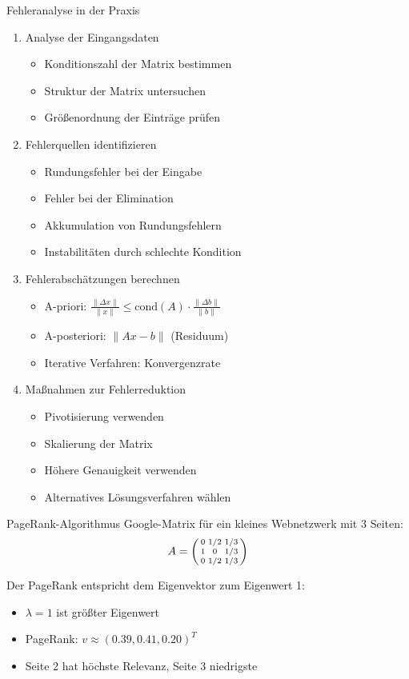 \begin{KR}{Fehleranalyse in der Praxis}
\begin{enumerate}
    \item Analyse der Eingangsdaten
    \begin{itemize}
        \item Konditionszahl der Matrix bestimmen
        \item Struktur der Matrix untersuchen
        \item Größenordnung der Einträge prüfen
    \end{itemize}
    
    \item Fehlerquellen identifizieren
    \begin{itemize}
        \item Rundungsfehler bei der Eingabe
        \item Fehler bei der Elimination
        \item Akkumulation von Rundungsfehlern
        \item Instabilitäten durch schlechte Kondition
    \end{itemize}
    
    \item Fehlerabschätzungen berechnen
    \begin{itemize}
        \item A-priori: $\frac{\|\Delta x\|}{\|x\|} \leq \text{cond}(A) \cdot \frac{\|\Delta b\|}{\|b\|}$
        \item A-posteriori: $\|Ax-b\|$ (Residuum)
        \item Iterative Verfahren: Konvergenzrate
    \end{itemize}
    
    \item Maßnahmen zur Fehlerreduktion
    \begin{itemize}
        \item Pivotisierung verwenden
        \item Skalierung der Matrix
        \item Höhere Genauigkeit verwenden
        \item Alternatives Lösungsverfahren wählen
    \end{itemize}
\end{enumerate}
\end{KR}

\begin{example2}{PageRank-Algorithmus}
Google-Matrix für ein kleines Webnetzwerk mit 3 Seiten:
$$A = \begin{psmallmatrix}
0 & 1/2 & 1/3\\
1 & 0 & 1/3\\
0 & 1/2 & 1/3
\end{psmallmatrix}$$

Der PageRank entspricht dem Eigenvektor zum Eigenwert 1:
\begin{itemize}
    \item $\lambda = 1$ ist größter Eigenwert
    \item PageRank: $v \approx (0.39, 0.41, 0.20)^T$
    \item Seite 2 hat höchste Relevanz, Seite 3 niedrigste
\end{itemize}
\end{example2}